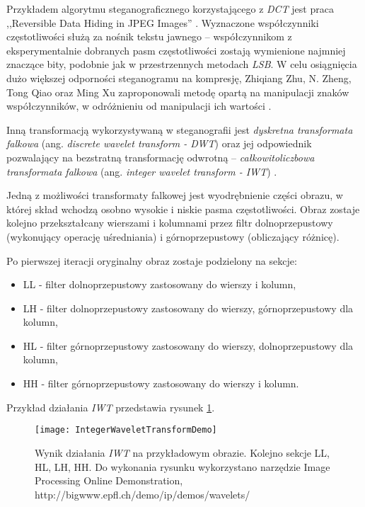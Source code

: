 {{{            %
            Przykładem algorytmu steganograficznego korzystającego z \textit{DCT} jest praca ,,Reversible Data
            Hiding in JPEG Images'' \cite{Huang2016ReversibleDH, Li2007ASM}. Wyznaczone współczynniki częstotliwości
            służą za nośnik tekstu jawnego -- współczynnikom z eksperymentalnie dobranych pasm częstotliwości zostają
            wymienione najmniej znaczące bity, podobnie jak w przestrzennych metodach \textit{LSB}. W celu osiągnięcia
            dużo większej odporności steganogramu na kompresję, Zhiqiang Zhu, N. Zheng, Tong Qiao oraz Ming Xu
            zaproponowali metodę opartą na manipulacji znaków współczynników, w odróżnieniu od manipulacji ich
            wartości \cite{Zhu2019RobustSB}.

            Inną transformacją wykorzystywaną w steganografii jest \textit{dyskretna transformata falkowa} (ang.
            \textit{discrete wavelet transform - DWT}) oraz jej odpowiednik pozwalający na bezstratną transformację
            odwrotną -- \textit{całkowitoliczbowa transformata falkowa} (ang. \textit{integer wavelet transform -
            IWT}) \cite{Xuan2005LosslessDH}.

            Jedną z możliwości transformaty falkowej jest wyodrębnienie części obrazu, w której skład wchodzą osobno
            wysokie i niskie pasma częstotliwości. Obraz zostaje kolejno przekształcany wierszami i kolumnami przez
            filtr dolnoprzepustowy (wykonujący operację uśredniania) i górnoprzepustowy (obliczający różnicę).

            Po pierwszej iteracji oryginalny obraz zostaje podzielony na sekcje:
            \begin{itemize}
                \item LL - filter dolnoprzepustowy zastosowany do wierszy i kolumn,
                \item LH - filter dolnoprzepustowy zastosowany do wierszy, górnoprzepustowy dla kolumn,
                \item HL - filter górnoprzepustowy zastosowany do wierszy, dolnoprzepustowy dla kolumn,
                \item HH - filter górnoprzepustowy zastosowany do wierszy i kolumn.
            \end{itemize}

            Przykład działania \textit{IWT} przedstawia rysunek \ref{fig:iwtdemo}.

            \begin{figure}
                \centering
                \texttt{[image: IntegerWaveletTransformDemo]}
                \caption{Wynik działania \textit{IWT} na przykładowym obrazie. Kolejno sekcje LL, HL, LH, HH. Do wykonania
                    rysunku wykorzystano narzędzie Image Processing Online Demonstration,
                    http://bigwww.epfl.ch/demo/ip/demos/wavelets/}
                \label{fig:iwtdemo}
            \end{figure}


}}}
